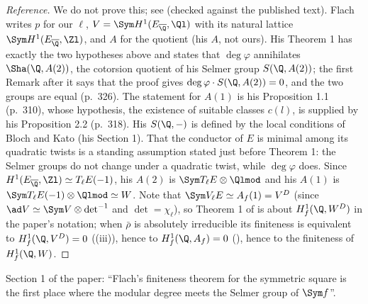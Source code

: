 \begin{proof}[Reference]
We do not prove this; see \cite[Theorem 1 and the Remarks after it, p.~308; Propositions 1.1 and 2.2]{Flach92} (checked against the published text). Flach writes $p$ for our
$\ell$, $V=\Sym H^1(E_{\overline\Q},\Ql)$ with its natural lattice $\Sym H^1(E_{\overline\Q},\Zl)$, and $A$ for the quotient (his $A$, not ours). His Theorem 1 has exactly the
two hypotheses above and states that $\deg\varphi$ annihilates $\Sha(\Q,A(2))$, the cotorsion quotient of his Selmer group $S(\Q,A(2))$; the first Remark after it says that
the proof gives $\deg\varphi\cdot S(\Q,A(2))=0$, and the two groups are equal (p.~326). The statement for $A(1)$ is his Proposition 1.1 (p.~310), whose hypothesis, the
existence of suitable classes $c(l)$, is supplied by his Proposition 2.2 (p.~318). His $S(\Q,-)$ is defined by the local conditions of Bloch and Kato (his Section 1). That the
conductor of $E$ is minimal among its quadratic twists is a standing assumption stated just before Theorem 1: the Selmer groups do not change under a quadratic twist,
while $\deg\varphi$ does. Since $H^1(E_{\overline\Q},\Zl)\simeq T_\ell E(-1)$, his $A(2)$ is $\Sym T_\ell E\otimes\Qlmod$ and his $A(1)$ is $\Sym T_\ell E(-1)\otimes\Qlmod\simeq W$. Note that
$\Sym V_\ell E\simeq A_f(1)=V^D$ (since $\ad V\simeq\Sym V\otimes\det^{-1}$ and $\det=\chi_\ell$), so Theorem 1 of \cite{Flach92} is about $H^1_f(\Q,W^D)$ in the paper's notation; when
$\bar\rho$ is absolutely irreducible its finiteness is
equivalent to $H^1_f(\Q,V^D)=0$ ((iii)), hence to $H^1_f(\Q,A_f)=0$ (), hence to the finiteness of
$H^1_f(\Q,W)$.
\end{proof}

\begin{paperlink}
Section 1 of the paper: ``Flach's finiteness theorem for the symmetric square \cite{Flach92} is the first place where the modular degree meets the Selmer group
of $\Sym f$''.
\end{paperlink}

